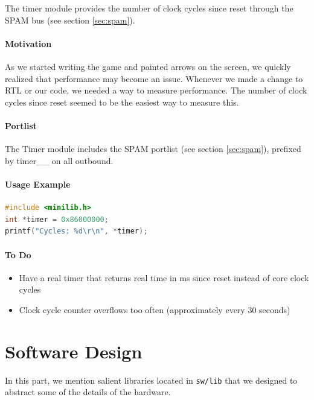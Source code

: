 \documentclass[10pt]{article}
\begin{document}
\label{sec:timer}

The timer module provides the number of clock cycles since reset through the
SPAM bus (see section \ref{sec:spam}).

\subsection{Motivation}

As we started writing the game and painted arrows on the screen, we quickly
realized that performance may become an issue. Whenever we made a change to
RTL or our code, we needed a way to measure performance. The number of clock
cycles since reset seemed to be the easiest way to measure this.

\subsection{Portlist}

The Timer module includes the SPAM portlist (see section \ref{sec:spam}),
prefixed by timer\_\_ on all outbound.

\subsection{Usage Example}
\begin{lstlisting}[basicstyle=\footnotesize,language=C]
#include <minilib.h>
int *timer = 0x86000000;
printf("Cycles: %d\r\n", *timer);
\end{lstlisting}

\subsection{To Do}

\begin{itemize}
\item{Have a real timer that returns real time in ms since reset instead of
core clock cycles}
\item{Clock cycle counter overflows too often (approximately every 30
seconds)}
\end{itemize}

\part{Software Design}

In this part, we mention salient libraries located in \texttt{sw/lib} that we 
designed to abstract some of the details of the hardware.
\end{document}

